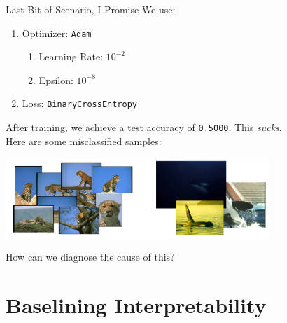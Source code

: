 \documentclass{beamer}
\begin{document}
\begin{frame}{Last Bit of Scenario, I Promise}
	We use:
	\begin{enumerate}[label=\alph*.]
		\item Optimizer: \texttt{Adam}
			\begin{enumerate}[label=-]
				\item Learning Rate: $10^{-2}$
				\item Epsilon: $10^{-8}$
			\end{enumerate}
		\item Loss: \texttt{BinaryCrossEntropy}
	\end{enumerate} \pause
	After training, we achieve a test accuracy of \texttt{0.5000}. This \textit{sucks}. \pause \newline \\

	Here are some misclassified samples:
	\begin{center}
		\hspace*{-7em}
		\includegraphics[width=10cm]{img/misclassifications}
	\end{center}

	\vspace{-1em}
	How can we diagnose the cause of this?
\end{frame}

\section{Baselining Interpretability}
\end{document}
